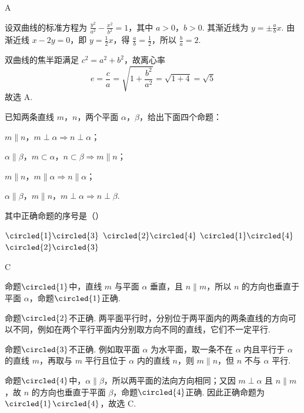 \begin{answer}
A
\end{answer}

\begin{solution}
设双曲线的标准方程为 \(\frac{y^{2}}{a^{2}}-\frac{x^{2}}{b^{2}}=1\)，其中 \(a>0\)，\(b>0\). 其渐近线为 \(y=\pm\frac{a}{b}x\). 由渐近线 \(x-2y=0\)，即 \(y=\frac{1}{2}x\)，得 \(\frac{a}{b}=\frac{1}{2}\)，所以 \(\frac{b}{a}=2\).

双曲线的焦半距满足 \(c^{2}=a^{2}+b^{2}\)，故离心率
\[
e=\frac{c}{a}=\sqrt{1+\frac{b^{2}}{a^{2}}}=\sqrt{1+4}=\sqrt{5}
\]
故选 A.
\end{solution}

\begin{problem}
已知两条直线 \(m\)，\(n\)，两个平面 \(\alpha\)，\(\beta\)，给出下面四个命题：

\begin{circlelist}
\item \(m \parallel n\)，\(m \perp \alpha \Rightarrow n \perp \alpha\)；
\item \(\alpha \parallel \beta\)，\(m \subset \alpha\)，\(n \subset \beta \Rightarrow m \parallel n\)；
\item \(m \parallel n\)，\(m \parallel \alpha \Rightarrow n \parallel \alpha\)；
\item \(\alpha \parallel \beta\)，\(m \parallel n\)，\(m \perp \alpha \Rightarrow n \perp \beta\).
\end{circlelist}

其中正确命题的序号是（\quad）

\choices
    {\(\circled{1}\circled{3}\)}
    {\(\circled{2}\circled{4}\)}
    {\(\circled{1}\circled{4}\)}
    {\(\circled{2}\circled{3}\)}
\end{problem}

\begin{answer}
C
\end{answer}

\begin{solution}
命题\(\circled{1}\)中，直线 \(m\) 与平面 \(\alpha\) 垂直，且 \(n\parallel m\)，所以 \(n\) 的方向也垂直于平面 \(\alpha\)，命题\(\circled{1}\)正确.

命题\(\circled{2}\)不正确. 两平面平行时，分别位于两平面内的两条直线的方向可以不同，例如在两个平行平面内分别取方向不同的直线，它们不一定平行.

命题\(\circled{3}\)不正确. 例如取平面 \(\alpha\) 为水平面，取一条不在 \(\alpha\) 内且平行于 \(\alpha\) 的直线 \(m\)，再取与 \(m\) 平行且位于 \(\alpha\) 内的直线 \(n\)，则 \(m\parallel n\)，但 \(n\) 不与 \(\alpha\) 平行.

命题\(\circled{4}\)中，\(\alpha\parallel\beta\)，所以两平面的法向方向相同；又因 \(m\perp\alpha\) 且 \(n\parallel m\)，故 \(n\) 的方向也垂直于平面 \(\beta\)，命题\(\circled{4}\)正确. 因此正确命题为\(\circled{1}\)\(\circled{4}\)，故选 C.
\end{solution}

